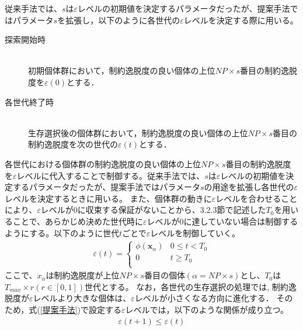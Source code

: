 \documentclass[a4paper,12pt]{jsreport}
\begin{document}


従来手法では、$s$は$\varepsilon$レベルの初期値を決定するパラメータだったが、提案手法ではパラメータ$s$を拡張し，以下のように各世代の$\varepsilon$レベルを決定する際に用いる。

\begin{description}
 \item[探索開始時]\\
初期個体群において，制約逸脱度の良い個体の上位$NP×s$番目の制約逸脱度を$\varepsilon (0)$とする．

 \item[各世代終了時]\\
生存選択後の個体群において，制約逸脱度の良い個体の上位$NP×s$番目の制約逸脱度を次の世代の$\varepsilon (t)$とする．
\end{description}


各世代における個体群の制約逸脱度の良い個体の上位$NP×s$番目の制約逸脱度を$\varepsilon$レベルに代入することで制御する。従来手法では、$s$は$\varepsilon$レベルの初期値を決定するパラメータだったが、提案手法ではパラメータ$s$の用途を拡張し各世代の$\varepsilon$レベルを決定するときに用いる。
また、個体群の動きに$\varepsilon$レベルを合わせることにより、$\varepsilon$レベルが0に収束する保証がないことから、3.2.3節で記述した${T}_0$を用いることで、あらかじめ決めた世代時に$\varepsilon$レベルが0に達していない場合は制御するようにする。以下のように世代$t$ごとで$\varepsilon$レベルを制御していく。
\begin{eqnarray}
\varepsilon(t)=
\left\{
\begin{array}{cc}
    {\phi({\bm x}_\alpha)} & \mbox{$0\leq t<{T}_0$} \\
    {0} & \mbox{$t\geq{T}_0$}\\
\end{array}
\right.
\label{提案手法}
\end{eqnarray}
ここで、${x}_\alpha$は制約逸脱度が上位$NP×s$番目の個体$(\alpha=NP \times s)$とし、${T}_0$は${T}_{max}\times{r}(r\in[0,1])$世代とする。
なお，各世代の生存選択の処理では,
制約逸脱度が$\varepsilon$レベルより大きな個体は、$\varepsilon$レベルが小さくなる方向に進化する．
そのため，式(\ref{提案手法})で設定する$\varepsilon$レベルでは，以下のような関係が成り立つ。
\begin{eqnarray}
\varepsilon(t+1) \leq \varepsilon(t)
\end{eqnarray}
\end{document}
